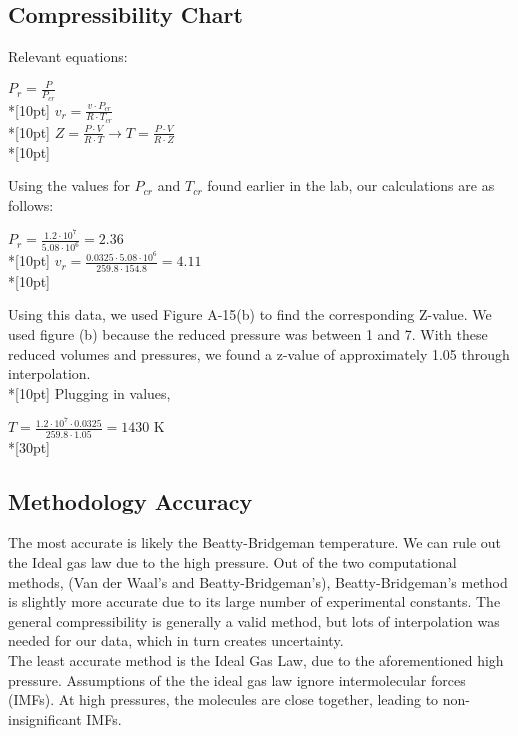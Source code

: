 \documentclass{article}
\begin{document}
\subsection{Compressibility Chart}
Relevant equations:
\begin{center}
\(\displaystyle P_r=\frac{P}{P_{cr}}\)\\*[10pt]
\(\displaystyle v_r=\frac{v\cdot P_{cr}}{R\cdot T_{cr}}\)\\*[10pt]
\(\displaystyle Z=\frac{P\cdot V}{R\cdot T}\rightarrow T=\frac{P\cdot V}{R\cdot Z}\)\\*[10pt]
\end{center}
Using the values for \(P_{cr}\) and \(T_{cr}\) found earlier in the lab, our calculations are as follows:
\begin{center}
\(\displaystyle P_r=\frac{1.2\cdot10^7}{5.08\cdot10^6}=2.36\)\\*[10pt]
\(\displaystyle v_r=\frac{0.0325\cdot 5.08\cdot10^6}{259.8\cdot 154.8}=4.11\)\\*[10pt]
\end{center}
Using this data, we used Figure A-15(b) to find the corresponding Z-value. We used figure (b) because the reduced pressure was between 1 and 7. With these reduced volumes and pressures, we found a z-value of approximately 1.05 through interpolation. \\*[10pt]
Plugging in values,
\begin{center}
\(\displaystyle T=\frac{1.2\cdot10^7\cdot 0.0325}{259.8\cdot 1.05}=1430\) K\\*[30pt]
\end{center}
\subsection{Methodology Accuracy}
The most accurate is likely the Beatty-Bridgeman temperature. We can rule out the
Ideal gas law due to the high pressure. Out of the two computational methods,
(Van der Waal’s and Beatty-Bridgeman’s), Beatty-Bridgeman’s method is slightly more
accurate due to its large number of experimental constants. The general compressibility is generally a valid method, but lots of interpolation was needed for our data, which in turn creates uncertainty. \\

\noindent The least accurate method is the Ideal Gas Law, due to the aforementioned high pressure. Assumptions of the the ideal gas law ignore intermolecular forces (IMFs). At high pressures, the molecules are close together, leading to non-insignificant IMFs.  
\end{document}
